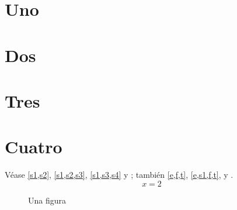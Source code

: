 \documentclass[spanish]{article}
\begin{document}
\section{Uno}\label{s1}
\section{Dos}\label{s2}
\section{Tres}\label{s3}
\section{Cuatro}\label{s4}
Véase \cref{s1,s2}, \cref{s1,s2,s3}, \cref{s1,s3,s4} y ; también \cref{e,f,t}, \cref{e,s1,f,t},  y .
\begin{equation}x = 2\label{e}\end{equation}
\begin{figure}[h]
\caption{Una figura}\label{f}
\end{figure}
\begin{table}[h]
\caption{Una tabla}\label{t}
\end{table}
\end{document}
